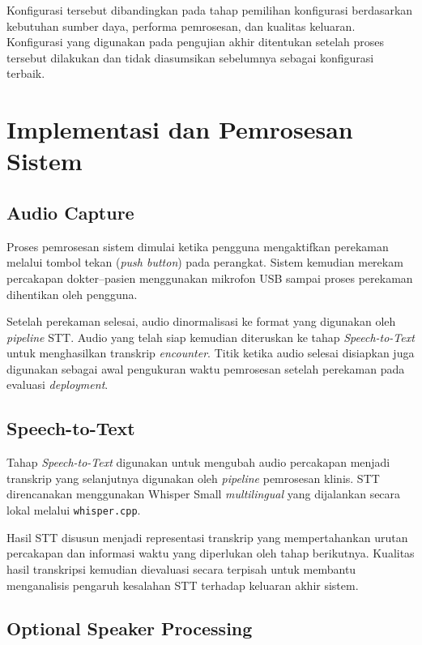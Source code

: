 Konfigurasi tersebut dibandingkan pada tahap pemilihan konfigurasi berdasarkan kebutuhan sumber daya, performa pemrosesan, dan kualitas keluaran. Konfigurasi yang digunakan pada pengujian akhir ditentukan setelah proses tersebut dilakukan dan tidak diasumsikan sebelumnya sebagai konfigurasi terbaik.

\section{Implementasi dan Pemrosesan Sistem}
\label{sec:implementasisistem}

\subsection{Audio Capture}
\label{subsec:audiocapture}

Proses pemrosesan sistem dimulai ketika pengguna mengaktifkan perekaman melalui tombol tekan (\emph{push button}) pada perangkat. Sistem kemudian merekam percakapan dokter--pasien menggunakan mikrofon USB sampai proses perekaman dihentikan oleh pengguna.

Setelah perekaman selesai, audio dinormalisasi ke format yang digunakan oleh \emph{pipeline} STT. Audio yang telah siap kemudian diteruskan ke tahap \emph{Speech-to-Text} untuk menghasilkan transkrip \emph{encounter}. Titik ketika audio selesai disiapkan juga digunakan sebagai awal pengukuran waktu pemrosesan setelah perekaman pada evaluasi \emph{deployment}.

\subsection{Speech-to-Text}
\label{subsec:speechtotext}

Tahap \emph{Speech-to-Text} digunakan untuk mengubah audio percakapan menjadi transkrip yang selanjutnya digunakan oleh \emph{pipeline} pemrosesan klinis. STT direncanakan menggunakan Whisper Small \emph{multilingual} yang dijalankan secara lokal melalui \texttt{whisper.cpp}.

Hasil STT disusun menjadi representasi transkrip yang mempertahankan urutan percakapan dan informasi waktu yang diperlukan oleh tahap berikutnya. Kualitas hasil transkripsi kemudian dievaluasi secara terpisah untuk membantu menganalisis pengaruh kesalahan STT terhadap keluaran akhir sistem.

\subsection{Optional Speaker Processing}
\label{subsec:speakerprocessing}


